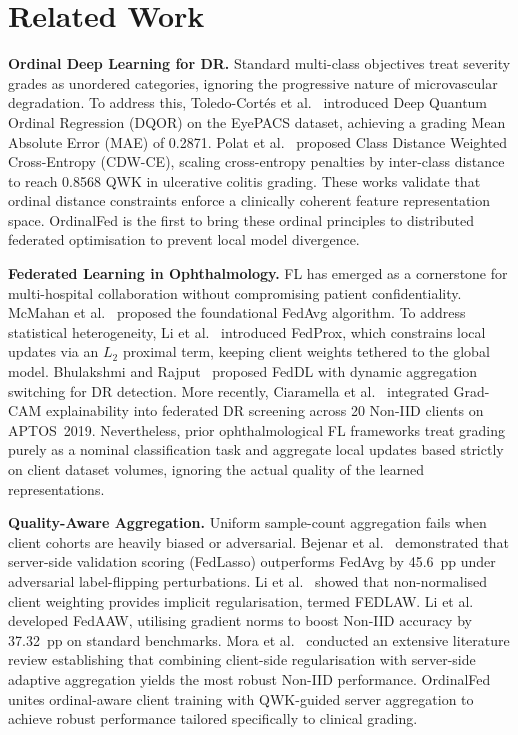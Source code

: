 \section{Related Work}
\label{sec:related}

\textbf{Ordinal Deep Learning for DR.}
Standard multi-class objectives treat severity grades as unordered categories,
ignoring the progressive nature of microvascular degradation. To address this,
Toledo-Cort\'{e}s et al.~\cite{toledocortes2022dqor} introduced Deep Quantum
Ordinal Regression (DQOR) on the EyePACS dataset, achieving a grading Mean
Absolute Error (MAE) of 0.2871. Polat et al.~\cite{polat2024cdwce} proposed
Class Distance Weighted Cross-Entropy (CDW-CE), scaling cross-entropy penalties
by inter-class distance to reach 0.8568 QWK in ulcerative colitis grading. These
works validate that ordinal distance constraints enforce a clinically coherent
feature representation space. OrdinalFed is the first to bring these ordinal
principles to distributed federated optimisation to prevent local model divergence.

\textbf{Federated Learning in Ophthalmology.}
FL has emerged as a cornerstone for multi-hospital collaboration without
compromising patient confidentiality. McMahan et al.~\cite{mcmahan2017fedavg}
proposed the foundational FedAvg algorithm. To address statistical heterogeneity,
Li et al.~\cite{li2020fedprox} introduced FedProx, which constrains local updates
via an $L_2$ proximal term, keeping client weights tethered to the global model.
Bhulakshmi and Rajput~\cite{bhulakshmi2024feddl} proposed FedDL with dynamic
aggregation switching for DR detection. More recently, Ciaramella et
al.~\cite{ciaramella2025fl} integrated Grad-CAM explainability into federated DR
screening across 20 Non-IID clients on APTOS~2019. Nevertheless, prior
ophthalmological FL frameworks treat grading purely as a nominal classification
task and aggregate local updates based strictly on client dataset volumes,
ignoring the actual quality of the learned representations.

\textbf{Quality-Aware Aggregation.}
Uniform sample-count aggregation fails when client cohorts are heavily biased or
adversarial. Bejenar et al.~\cite{bejenar2023aggregation} demonstrated that
server-side validation scoring (FedLasso) outperforms FedAvg by 45.6~pp under
adversarial label-flipping perturbations. Li et al.~\cite{li2023revisiting} showed
that non-normalised client weighting provides implicit regularisation, termed FEDLAW.
Li et al.~\cite{li2025fedaaw} developed FedAAW, utilising gradient norms to boost
Non-IID accuracy by 37.32~pp on standard benchmarks. Mora et
al.~\cite{mora2024review} conducted an extensive literature review establishing that
combining client-side regularisation with server-side adaptive aggregation yields
the most robust Non-IID performance. OrdinalFed unites ordinal-aware client training
with QWK-guided server aggregation to achieve robust performance tailored
specifically to clinical grading.

